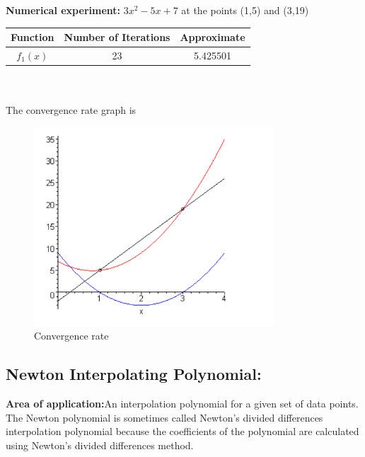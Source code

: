 \documentclass{article}
\begin{document}
	{\bf Numerical experiment:}
	$3x^2 − 5x + 7$ at the points (1,5) and (3,19)
	
\begin{tabular}{|c|c|c|}
	\hline 
	Function &
	Number of Iterations &
	Approximate
	\\ 
	\hline
	
	$f_1(x)$ & 23 &  5.425501 \\
	\hline
	
\end{tabular}\\    
	\\[0.1in]
	The convergence rate graph is
	\begin{figure}[H]
		\caption{Convergence rate}
		\includegraphics[width=0.8\textwidth, height=0.6\textwidth]{vandermonder.png}
	\end{figure}
	\subsection{Newton Interpolating Polynomial:}
	{\bf Area of application:}An interpolation polynomial for a given set of data points. The Newton polynomial is sometimes called Newton's divided differences interpolation polynomial because the coefficients of the polynomial are calculated using Newton's divided differences method.
	
\end{document}
